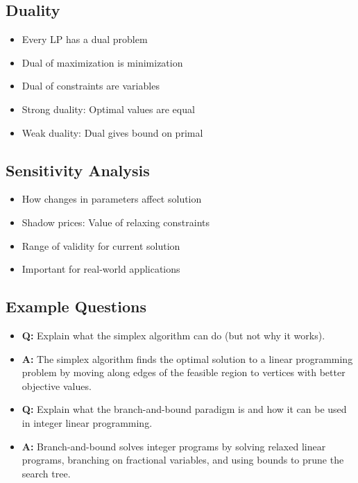 \documentclass[11pt,a4paper]{article}
\begin{document}
\begin{multicols}{2}
\subsection{Duality}
\begin{itemize}
    \item Every LP has a dual problem
    \item Dual of maximization is minimization
    \item Dual of constraints are variables
    \item Strong duality: Optimal values are equal
    \item Weak duality: Dual gives bound on primal
\end{itemize}

\subsection{Sensitivity Analysis}
\begin{itemize}
    \item How changes in parameters affect solution
    \item Shadow prices: Value of relaxing constraints
    \item Range of validity for current solution
    \item Important for real-world applications
\end{itemize}

\subsection{Example Questions}
\begin{itemize}
    \item \textbf{Q:} Explain what the simplex algorithm can do (but not why it works).
    \item \textbf{A:} The simplex algorithm finds the optimal solution to a linear programming problem by moving along edges of the feasible region to vertices with better objective values.

    \item \textbf{Q:} Explain what the branch-and-bound paradigm is and how it can be used in integer linear programming.
    \item \textbf{A:} Branch-and-bound solves integer programs by solving relaxed linear programs, branching on fractional variables, and using bounds to prune the search tree.
\end{itemize}

\end{multicols}
\end{document}

